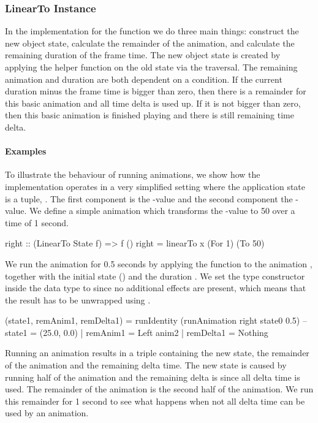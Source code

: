 \subsubsection{LinearTo Instance}

In the implementation for the  function we do three main things: construct the new object state, calculate the remainder of the animation, and calculate the remaining duration of the frame time. The new object state is created by applying the helper function  on the old state via the traversal. The remaining animation and duration are both dependent on a condition. If the current duration minus the frame time is bigger than zero, then there is a remainder for this basic animation and all time delta is used up. If it is not bigger than zero, then this basic animation is finished playing and there is still remaining time delta.

\paragraph{Examples}

To illustrate the behaviour of running animations, we show how the implementation operates in a very simplified setting where the application state is a tuple, . The first component is the -value and the second component the -value. We define a simple animation  which transforms the -value to 50 over a time of 1 second.

\begin{code}
right :: (LinearTo State f) => f ()
right = linearTo x (For 1) (To 50)
\end{code}

We run the animation for 0.5 seconds by applying the  function to the animation , together with the initial state () and the duration . We set the type constructor  inside the  data type to  since no additional effects are present, which means that the result has to be unwrapped using .

\begin{code}
(state1, remAnim1, remDelta1) =
  runIdentity (runAnimation right state0 0.5)
-- state1 = (25.0, 0.0) | remAnim1 = Left anim2 | remDelta1 = Nothing
\end{code}

Running an animation results in a triple containing the new state, the remainder of the animation and the remaining delta time. The new state is  caused by running half of the  animation and the remaining delta is  since all delta time is used. The remainder of the animation is the second half of the  animation. We run this remainder for 1 second to see what happens when not all delta time can be used by an animation.

